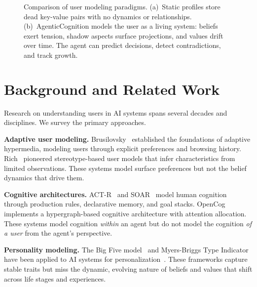 \documentclass[10pt, twocolumn]{article}
\begin{document}
\begin{figure}[t]
\caption{Comparison of user modeling paradigms. (a)~Static profiles store dead key-value pairs with no dynamics or relationships. (b)~AgenticCognition models the user as a living system: beliefs exert tension, shadow aspects surface projections, and values drift over time. The agent can predict decisions, detect contradictions, and track growth.}
\label{fig:comparison}
\end{figure}


\section{Background and Related Work}
\label{sec:related}

Research on understanding users in AI systems spans several decades and disciplines. We survey the primary approaches.

\textbf{Adaptive user modeling.} Brusilovsky~\cite{brusilovsky2001adaptive} established the foundations of adaptive hypermedia, modeling users through explicit preferences and browsing history. Rich~\cite{rich1979user} pioneered stereotype-based user models that infer characteristics from limited observations. These systems model surface preferences but not the belief dynamics that drive them.

\textbf{Cognitive architectures.} ACT-R~\cite{anderson2004integrated} and SOAR~\cite{laird2012soar} model human cognition through production rules, declarative memory, and goal stacks. OpenCog~\cite{goertzel2014opencog} implements a hypergraph-based cognitive architecture with attention allocation. These systems model cognition \emph{within} an agent but do not model the cognition \emph{of a user} from the agent's perspective.

\textbf{Personality modeling.} The Big Five model~\cite{goldberg1990alternative} and Myers-Briggs Type Indicator have been applied to AI systems for personalization~\cite{mairesse2007personage}. These frameworks capture stable traits but miss the dynamic, evolving nature of beliefs and values that shift across life stages and experiences.
\end{document}
